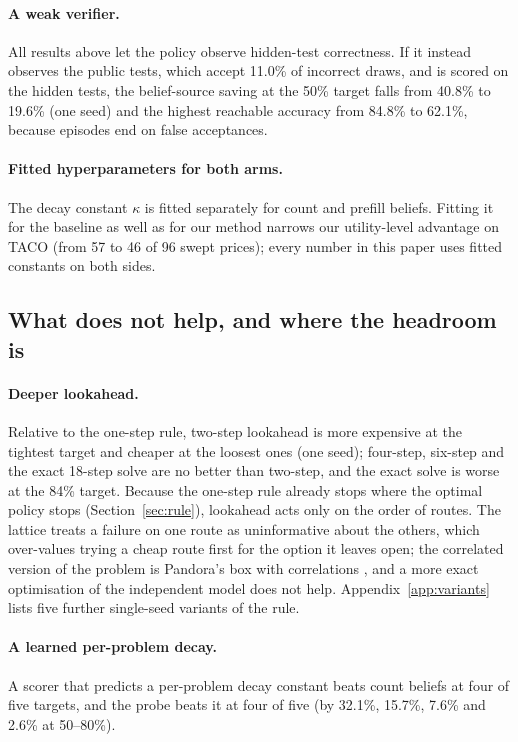 \documentclass[10pt]{article} %
\begin{document}
\paragraph{A weak verifier.}
All results above let the policy observe hidden-test correctness.  If it instead observes the
public tests, which accept 11.0\% of incorrect draws, and is scored on the hidden tests, the
belief-source saving at the 50\% target falls from 40.8\% to 19.6\% (one seed) and the highest
reachable accuracy from 84.8\% to 62.1\%, because episodes end on false acceptances.

\paragraph{Fitted hyperparameters for both arms.}
The decay constant $\kappa$ is fitted separately for count and prefill beliefs.  Fitting it for
the baseline as well as for our method narrows our utility-level advantage on TACO (from 57 to 46
of 96 swept prices); every number in this paper uses fitted constants on both sides.

\subsection{What does not help, and where the headroom is}
\label{sec:diagnostics}

\paragraph{Deeper lookahead.}
Relative to the one-step rule, two-step lookahead is more expensive at the tightest target and
cheaper at the loosest ones (one seed); four-step, six-step and the exact 18-step solve are no
better than two-step, and the exact solve is worse at the 84\% target.  Because the one-step rule
already stops where the optimal policy stops (Section~\ref{sec:rule}), lookahead acts only on the
order of routes.  The lattice treats a failure on one route as uninformative about the others,
which over-values trying a cheap route first for the option it leaves open; the
correlated version of the problem is Pandora's box with correlations
\citep{gergatsouli2023weitzman}, and a more exact optimisation of the independent model does not
help.  Appendix~\ref{app:variants} lists five further single-seed variants of the rule.

\paragraph{A learned per-problem decay.}
A scorer that predicts a per-problem decay constant beats count beliefs at four of five targets,
and the probe beats it at four of five (by 32.1\%, 15.7\%, 7.6\% and 2.6\% at 50--80\%).
\end{document}
